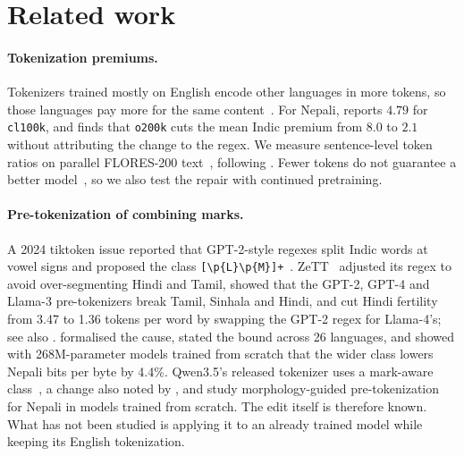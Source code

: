 \section{Related work}
\label{sec:related}

\paragraph{Tokenization premiums.} Tokenizers trained mostly on English encode other languages in more tokens, so those languages pay more for the same content~\citep{rust-etal-2021-good,petrov2023unfairness,ahia-etal-2023-languages,lundin-etal-2026-token}. For Nepali, \citet{kadariya2026nepali} reports $4.79$ for \texttt{cl100k}, and \citet{srivastava2026tokenizertax} finds that \texttt{o200k} cuts the mean Indic premium from $8.0$ to $2.1$ without attributing the change to the regex. We measure sentence-level token ratios on parallel FLORES-200 text~\citep{goyal-etal-2022-flores,nllb2022}, following \citet{petrov2023unfairness}. Fewer tokens do not guarantee a better model~\citep{schmidt-etal-2024-tokenization,zouhar-etal-2023-tokenization,luitel2025perplexity}, so we also test the repair with continued pretraining.

\paragraph{Pre-tokenization of combining marks.} A 2024 tiktoken issue reported that GPT-2-style regexes split Indic words at vowel signs and proposed the class \texttt{[\textbackslash p\{L\}\textbackslash p\{M\}]+}~\citep{tiktoken_issue292}. ZeTT~\citep{minixhofer2024zett} adjusted its regex to avoid over-segmenting Hindi and Tamil, \citet{velayuthan-sarveswaran-2025-egalitarian} showed that the GPT-2, GPT-4 and Llama-3 pre-tokenizers break Tamil, Sinhala and Hindi, and \citet{rana2025mutant} cut Hindi fertility from 3.47 to 1.36 tokens per word by swapping the GPT-2 regex for Llama-4's; see also \citet{thakur2025artofbreaking}. \citet{regmi2026vowel} formalised the cause, stated the bound across 26 languages, and showed with 268M-parameter models trained from scratch that the wider class lowers Nepali bits per byte by 4.4\%. Qwen3.5's released tokenizer uses a mark-aware class~\citep{qwen35tokenizer}, a change also noted by \citet{land2026smallbugs}, and \citet{shrestha2026papaya} study morphology-guided pre-tokenization for Nepali in models trained from scratch. The edit itself is therefore known. What has not been studied is applying it to an already trained model while keeping its English tokenization.

